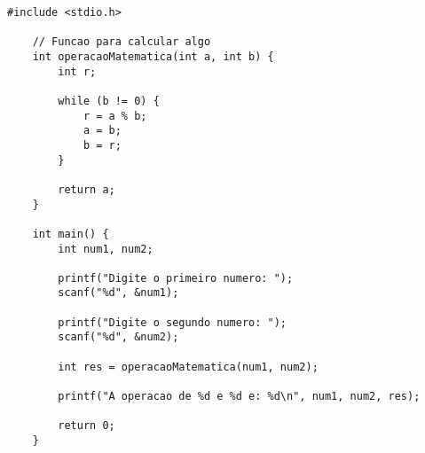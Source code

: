 \begin{lstlisting}[style=codigoC]
    #include <stdio.h>

    // Funcao para calcular algo
    int operacaoMatematica(int a, int b) {
        int r;
    
        while (b != 0) {
            r = a % b;
            a = b;
            b = r;
        }
    
        return a;
    }
    
    int main() {
        int num1, num2;
        
        printf("Digite o primeiro numero: ");
        scanf("%d", &num1);
        
        printf("Digite o segundo numero: ");
        scanf("%d", &num2);
    
        int res = operacaoMatematica(num1, num2);
    
        printf("A operacao de %d e %d e: %d\n", num1, num2, res);
    
        return 0;
    }
    
\end{lstlisting}